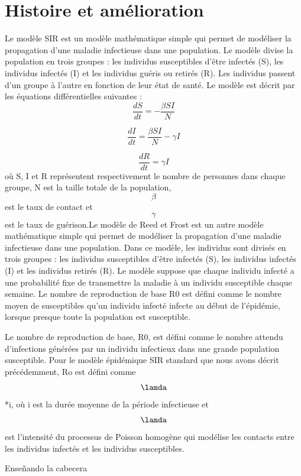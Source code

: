 \documentclass[11pt]{report}
\begin{document}
        \section{Histoire et amélioration}

	Le modèle SIR est un modèle mathématique simple qui permet de modéliser la propagation d'une maladie infectieuse dans une population. Le modèle divise la population en trois groupes : les individus susceptibles d'être infectés (S), les individus infectés (I) et les individus guéris ou retirés (R). Les individus passent d'un groupe à l'autre en fonction de leur état de santé. Le modèle est décrit par les équations différentielles suivantes :
$$\frac{dS}{dt} = -\frac{\beta SI}{N}$$

$$\frac{dI}{dt} = \frac{\beta SI}{N} - \gamma I$$

$$\frac{dR}{dt} = \gamma I$$
où S, I et R représentent respectivement le nombre de personnes dans chaque groupe, N est la taille totale de la population, $$\beta$$ est le taux de contact et $$\gamma$$ est le taux de guérison.Le modèle de Reed et Frost est un autre modèle mathématique simple qui permet de modéliser la propagation d'une maladie infectieuse dans une population. Dans ce modèle, les individus sont divisés en trois groupes : les individus susceptibles d'être infectés (S), les individus infectés (I) et les individus retirés (R). Le modèle suppose que chaque individu infecté a une probabilité fixe de transmettre la maladie à un individu susceptible chaque semaine. Le nombre de reproduction de base R0 est défini comme le nombre moyen de susceptibles qu'un individu infecté infecte au début de l'épidémie, lorsque presque toute la population est susceptible.

Le nombre de reproduction de base, R0, est défini comme le nombre attendu d'infections générées par un individu infectieux dans une grande population susceptible. Pour le modèle épidémique SIR standard que nous avons décrit précédemment, Ro est défini comme $$\lamda$$ *i, où i est la durée moyenne de la période infectieuse et $$\lamda$$ est l'intensité du processus de Poisson homogène qui modélise les contacts entre les individus infectés et les individus susceptibles.



            \newpage Enseñando la cabecera
		
            
            
 

\setlength{\abovedisplayskip}{6pt}
\setlength{\belowdisplayskip}{6pt}






	






 \listoffigures
\listoftables      
\renewcommand{\bibname}{Bibliography}





\end{document}
